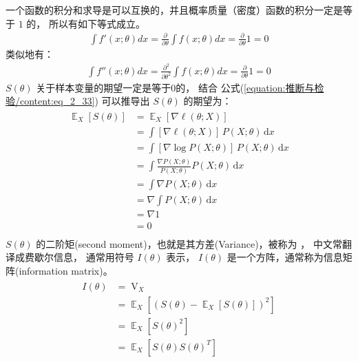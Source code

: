 \documentclass[letterpaper,10pt,english]{sphinxmanual}
\begin{document}
一个函数的积分和求导是可以互换的，并且概率质量（密度）函数的积分一定是等于 \(1\) 的，
所以有如下等式成立。
\begin{equation}\label{equation:推断与检验/content:eq_2_33}
\begin{split}\int f'(x;\theta) dx= \frac{\partial}{\partial \theta} \int f(x;\theta) dx
=\frac{\partial}{\partial \theta} 1
=0\end{split}
\end{equation}
类似地有：
\begin{equation}\label{equation:推断与检验/content:eq_2_34}
\begin{split}\int f''(x;\theta) dx= \frac{\partial^2}{\partial \theta^2} \int f(x;\theta) dx
=\frac{\partial}{\partial \theta} 1
=0\end{split}
\end{equation}
\(S(\theta)\) 关于样本变量的期望一定是等于0的，
结合 公式(\ref{equation:推断与检验/content:eq_2_33}) 可以推导出 \(S(\theta)\) 的期望为：
\begin{align}\label{equation:推断与检验/content:推断与检验/content:57}\!\begin{aligned}
\mathop{\mathbb{E}}_{X} \left[ S(\theta) \right] &= \mathop{\mathbb{E}}_{X} \left[ \nabla \ell(\theta;X) \right]\\
&= \int [\nabla \ell(\theta;X)] \, P(X ; \theta) \, \text{d}x\\
&= \int [\nabla \log P(X ; \theta)] \, P(X ; \theta) \, \text{d}x\\
&= \int \frac{\nabla P(X ; \theta)}{P(X ; \theta)} P(X ; \theta) \, \text{d} x\\
&= \int \nabla P(X ; \theta) \, \text{d} x\\
&= \nabla \int P(X; \theta) \, \text{d} x\\
&= \nabla 1\\
&= 0\\
\end{aligned}\end{align}
\(S(\theta)\) 的二阶矩(second moment)，也就是其方差(Variance)，被称为 ，
中文常翻译成费歇尔信息，
通常用符号 \(I(\theta)\) 表示，
\(I(\theta)\) 是一个方阵，通常称为信息矩阵(information matrix)。
\begin{align}\label{equation:推断与检验/content:eq_2_35}\!\begin{aligned}
I(\theta) &=\mathop{V(S(\theta))}_{X}\\
&=
\mathop{\mathbb{E}}_{X} [(S(\theta)- \mathop{\mathbb{E}}_{X} [S(\theta)] )^2]\\
&= \mathop{\mathbb{E}}_{X} [S(\theta)^2]\\
&= \mathop{\mathbb{E}}_{X} [S(\theta)S(\theta)^T]\\
\end{aligned}\end{align}
\end{document}
